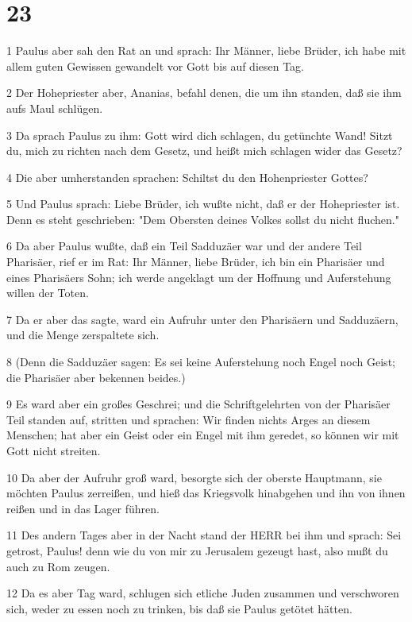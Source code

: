 \chapter{23}

\par 1 Paulus aber sah den Rat an und sprach: Ihr Männer, liebe Brüder, ich habe mit allem guten Gewissen gewandelt vor Gott bis auf diesen Tag.
\par 2 Der Hohepriester aber, Ananias, befahl denen, die um ihn standen, daß sie ihm aufs Maul schlügen.
\par 3 Da sprach Paulus zu ihm: Gott wird dich schlagen, du getünchte Wand! Sitzt du, mich zu richten nach dem Gesetz, und heißt mich schlagen wider das Gesetz?
\par 4 Die aber umherstanden sprachen: Schiltst du den Hohenpriester Gottes?
\par 5 Und Paulus sprach: Liebe Brüder, ich wußte nicht, daß er der Hohepriester ist. Denn es steht geschrieben: "Dem Obersten deines Volkes sollst du nicht fluchen."
\par 6 Da aber Paulus wußte, daß ein Teil Sadduzäer war und der andere Teil Pharisäer, rief er im Rat: Ihr Männer, liebe Brüder, ich bin ein Pharisäer und eines Pharisäers Sohn; ich werde angeklagt um der Hoffnung und Auferstehung willen der Toten.
\par 7 Da er aber das sagte, ward ein Aufruhr unter den Pharisäern und Sadduzäern, und die Menge zerspaltete sich.
\par 8 (Denn die Sadduzäer sagen: Es sei keine Auferstehung noch Engel noch Geist; die Pharisäer aber bekennen beides.)
\par 9 Es ward aber ein großes Geschrei; und die Schriftgelehrten von der Pharisäer Teil standen auf, stritten und sprachen: Wir finden nichts Arges an diesem Menschen; hat aber ein Geist oder ein Engel mit ihm geredet, so können wir mit Gott nicht streiten.
\par 10 Da aber der Aufruhr groß ward, besorgte sich der oberste Hauptmann, sie möchten Paulus zerreißen, und hieß das Kriegsvolk hinabgehen und ihn von ihnen reißen und in das Lager führen.
\par 11 Des andern Tages aber in der Nacht stand der HERR bei ihm und sprach: Sei getrost, Paulus! denn wie du von mir zu Jerusalem gezeugt hast, also mußt du auch zu Rom zeugen.
\par 12 Da es aber Tag ward, schlugen sich etliche Juden zusammen und verschworen sich, weder zu essen noch zu trinken, bis daß sie Paulus getötet hätten.
